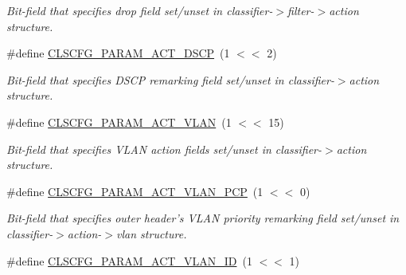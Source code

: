 \begin{DoxyCompactItemize}
\begin{DoxyCompactList}\small\item\em Bit-\/field that specifies drop field set/unset in classifier-\/$>$filter-\/$>$action structure. \end{DoxyCompactList}\item 
\hypertarget{group__FAPI__QOS__CLASS_ga82e1bba9306ae8610e232bdf1fe8a65b}{\#define \hyperlink{group__FAPI__QOS__CLASS_ga82e1bba9306ae8610e232bdf1fe8a65b}{C\-L\-S\-C\-F\-G\-\_\-\-P\-A\-R\-A\-M\-\_\-\-A\-C\-T\-\_\-\-D\-S\-C\-P}~(1 $<$$<$ 2)}\label{group__FAPI__QOS__CLASS_ga82e1bba9306ae8610e232bdf1fe8a65b}

\begin{DoxyCompactList}\small\item\em Bit-\/field that specifies D\-S\-C\-P remarking field set/unset in classifier-\/$>$action structure. \end{DoxyCompactList}\item 
\hypertarget{group__FAPI__QOS__CLASS_gaa27a5868ebd8f7bb2fc9a51bd966aeb4}{\#define \hyperlink{group__FAPI__QOS__CLASS_gaa27a5868ebd8f7bb2fc9a51bd966aeb4}{C\-L\-S\-C\-F\-G\-\_\-\-P\-A\-R\-A\-M\-\_\-\-A\-C\-T\-\_\-\-V\-L\-A\-N}~(1 $<$$<$ 15)}\label{group__FAPI__QOS__CLASS_gaa27a5868ebd8f7bb2fc9a51bd966aeb4}

\begin{DoxyCompactList}\small\item\em Bit-\/field that specifies V\-L\-A\-N action fields set/unset in classifier-\/$>$action structure. \end{DoxyCompactList}\item 
\hypertarget{group__FAPI__QOS__CLASS_gaf0dc3807b76fe3deec00cd30970f6b52}{\#define \hyperlink{group__FAPI__QOS__CLASS_gaf0dc3807b76fe3deec00cd30970f6b52}{C\-L\-S\-C\-F\-G\-\_\-\-P\-A\-R\-A\-M\-\_\-\-A\-C\-T\-\_\-\-V\-L\-A\-N\-\_\-\-P\-C\-P}~(1 $<$$<$ 0)}\label{group__FAPI__QOS__CLASS_gaf0dc3807b76fe3deec00cd30970f6b52}

\begin{DoxyCompactList}\small\item\em Bit-\/field that specifies outer header's V\-L\-A\-N priority remarking field set/unset in classifier-\/$>$action-\/$>$vlan structure. \end{DoxyCompactList}\item 
\hypertarget{group__FAPI__QOS__CLASS_ga6780ee04618d1f8fc512db7f55223a72}{\#define \hyperlink{group__FAPI__QOS__CLASS_ga6780ee04618d1f8fc512db7f55223a72}{C\-L\-S\-C\-F\-G\-\_\-\-P\-A\-R\-A\-M\-\_\-\-A\-C\-T\-\_\-\-V\-L\-A\-N\-\_\-\-I\-D}~(1 $<$$<$ 1)}\label{group__FAPI__QOS__CLASS_ga6780ee04618d1f8fc512db7f55223a72}


\end{DoxyCompactItemize}
